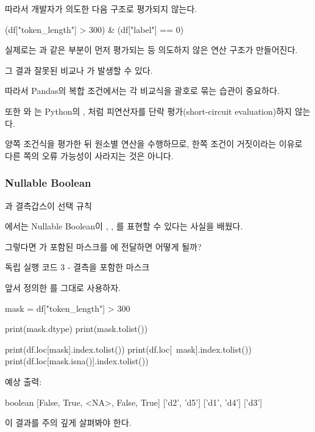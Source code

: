 따라서 개발자가 의도한 다음 구조로 평가되지 않는다.

\begin{dhkcode}
(df["token_length"] > 300) & (df["label"] == 0)
\end{dhkcode}

실제로는 과 같은 부분이 먼저 평가되는 등 의도하지 않은 연산 구조가 만들어진다.

그 결과 잘못된 비교나 가 발생할 수 있다.

따라서 Pandas의 복합 조건에서는 각 비교식을 괄호로 묶는 습관이 중요하다.

또한 \zsh{&}와 \zsh{|}는 Python의 , 처럼 피연산자를 단락 평가(short-circuit evaluation)하지 않는다.

양쪽 조건식을 평가한 뒤 원소별 연산을 수행하므로, 한쪽 조건이 거짓이라는 이유로 다른 쪽의 오류 가능성이 사라지는 것은 아니다.

\subsubsection{Nullable Boolean}과 결측갑스이 선택 규칙

에서는 Nullable Boolean이 , , 를 표현할 수 있다는 사실을 배웠다.

그렇다면 가 포함된 마스크를 에 전달하면 어떻게 될까?

\begin{dhknote}
\begin{dhksmry}[centered]
독립 실행 코드 3 - 결측을 포함한 마스크
\end{dhksmry}
\end{dhknote}

앞서 정의한 를 그대로 사용하자.

\begin{dhkcode}
mask = df["token_length"] > 300

print(mask.dtype)
print(mask.tolist())

print(df.loc[mask].index.tolist())
print(df.loc[~mask].index.tolist())
print(df.loc[mask.isna()].index.tolist())
\end{dhkcode}

예상 출력:

\begin{dhkzsh}
boolean
[False, True, <NA>, False, True]
['d2', 'd5']
['d1', 'd4']
['d3']
\end{dhkzsh}

이 결과를 주의 깊게 살펴봐야 한다.

